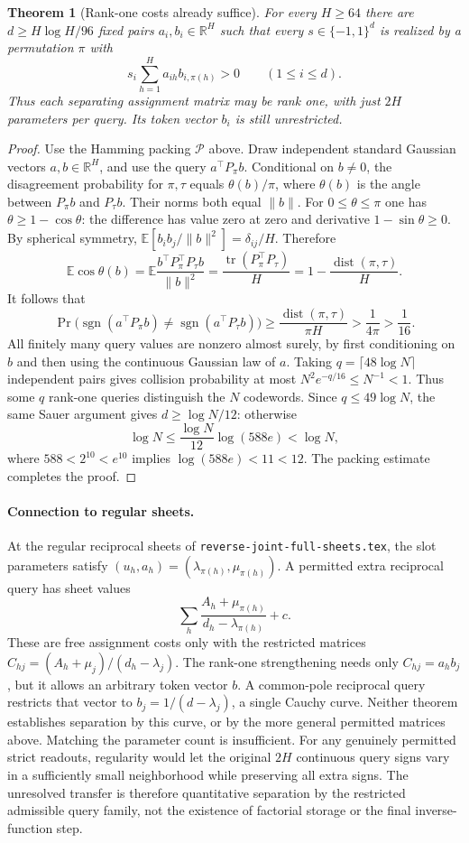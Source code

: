 \documentclass[11pt]{article}
\newtheorem{theorem}{Theorem}
\begin{document}
\begin{theorem}[Rank-one costs already suffice]
For every $H\geq64$ there are $d\geq H\log H/96$ fixed pairs
$a_i,b_i\in\mathbb R^H$ such that every $s\in\{-1,1\}^d$ is realized
by a permutation $\pi$ with
\[
 s_i\sum_{h=1}^H a_{ih}b_{i,\pi(h)}>0\qquad(1\leq i\leq d).
\]
Thus each separating assignment matrix may be rank one, with just
$2H$ parameters per query. Its token vector $b_i$ is still unrestricted.
\end{theorem}
\begin{proof}
Use the Hamming packing $\mathcal P$ above. Draw independent standard
Gaussian vectors $a,b\in\mathbb R^H$, and use the query
$a^\top P_\pi b$. Conditional on $b\ne0$, the disagreement probability
for $\pi,\tau$ equals $\theta(b)/\pi$, where $\theta(b)$ is the angle
between $P_\pi b$ and $P_\tau b$. Their norms both equal $\|b\|$.
For $0\leq\theta\leq\pi$ one has $\theta\geq1-\cos\theta$:
the difference has value zero at zero and derivative
$1-\sin\theta\geq0$. By spherical symmetry,
$\mathbb E[b_ib_j/\|b\|^2]=\delta_{ij}/H$. Therefore
\[
 \mathbb E\cos\theta(b)
 =\mathbb E\frac{b^\top P_\pi^\top P_\tau b}{\|b\|^2}
 =\frac{\operatorname{tr}(P_\pi^\top P_\tau)}H
 =1-\frac{\operatorname{dist}(\pi,\tau)}H.
\]
It follows that
\[
 \Pr\bigl(\operatorname{sgn}(a^\top P_\pi b)
       \ne\operatorname{sgn}(a^\top P_\tau b)\bigr)
 \geq\frac{\operatorname{dist}(\pi,\tau)}{\pi H}
 >\frac1{4\pi}>\frac1{16}.
\]
All finitely many query values are nonzero almost surely, by first
conditioning on $b$ and then using the continuous Gaussian law of $a$.
Taking $q=\lceil48\log N\rceil$ independent pairs gives collision
probability at most $N^2e^{-q/16}\leq N^{-1}<1$. Thus some $q$ rank-one
queries distinguish the $N$ codewords. Since $q\leq49\log N$, the same
Sauer argument gives $d\geq\log N/12$: otherwise
\[
 \log N\leq\frac{\log N}{12}\log(588e)<\log N,
\]
where $588<2^{10}<e^{10}$ implies $\log(588e)<11<12$.
The packing estimate completes the proof.
\end{proof}

\paragraph{Connection to regular sheets.}
At the regular reciprocal sheets of
\texttt{reverse-joint-full-sheets.tex}, the slot parameters satisfy
$(u_h,a_h)=(\lambda_{\pi(h)},\mu_{\pi(h)})$.
A permitted extra reciprocal query has sheet values
\[
\sum_h\frac{A_h+\mu_{\pi(h)}}{d_h-\lambda_{\pi(h)}}+c.
\]
These are free assignment costs only with the restricted matrices
$C_{hj}=(A_h+\mu_j)/(d_h-\lambda_j)$.
The rank-one strengthening needs only $C_{hj}=a_hb_j$, but it allows
an arbitrary token vector $b$. A common-pole reciprocal query restricts
that vector to $b_j=1/(d-\lambda_j)$, a single Cauchy curve. Neither
theorem establishes separation by this curve, or by the more general
permitted matrices above. Matching the parameter count is insufficient.
For any genuinely permitted strict readouts, regularity would let the
original $2H$ continuous query signs vary in a sufficiently small
neighborhood while preserving all extra signs. The unresolved transfer
is therefore quantitative separation by the restricted admissible
query family, not the existence of factorial storage or the final
inverse-function step.
\end{document}
